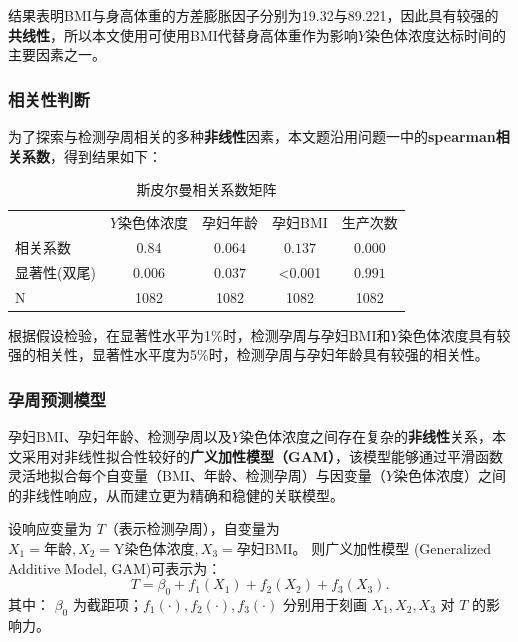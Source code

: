 \documentclass[12pt]{ctexart}
\begin{document}
	结果表明BMI与身高体重的方差膨胀因子分别为19.32与89.221，因此具有较强的\textbf{共线性}，所以本文使用可使用BMI代替身高体重作为影响$Y$染色体浓度达标时间的主要因素之一。
	
	\subsubsection{相关性判断}
	
	为了探索与检测孕周相关的多种\textbf{非线性}因素，本文题沿用问题一中的\textbf{spearman相关系数}，得到结果如下：
	\begin{table}[H]
		\centering
		\caption{斯皮尔曼相关系数矩阵}
		\begin{threeparttable}
			\setlength{\tabcolsep}{5pt} %
			\begin{tabular}{lcccc} 
				\toprule
				& $Y$染色体浓度 & 孕妇年龄  & 孕妇BMI  & 生产次数 \\
				\cmidrule(lr){2-5}
				相关系数
				& 0.84 & $0.064$ & $0.137$ &  $0.000$  \\
				显著性(双尾)
				& 0.006 & $0.037$ & <0.001 & $0.991$   \\
				N
				& 1082 & 1082 & 1082 & 1082  \\
				\bottomrule
			\end{tabular}
		\end{threeparttable}
	\end{table}

	根据假设检验，在显著性水平为1\%时，检测孕周与孕妇BMI和$Y$染色体浓度具有较强的相关性，显著性水平度为5\%时，检测孕周与孕妇年龄具有较强的相关性。
	
	\subsubsection{孕周预测模型}
	孕妇BMI、孕妇年龄、检测孕周以及$Y$染色体浓度之间存在复杂的\textbf{非线性}关系，本文采用对非线性拟合性较好的\textbf{广义加性模型（GAM）}，该模型能够通过平滑函数灵活地拟合每个自变量（BMI、年龄、检测孕周）与因变量（$Y$染色体浓度）之间的非线性响应，从而建立更为精确和稳健的关联模型。
	
	设响应变量为 $T$（表示检测孕周），自变量为
	$X_1 = \text{年龄},
	X_2 = \text{Y染色体浓度}, 
	X_3 = \text{孕妇BMI}$。
	则广义加性模型 (Generalized Additive Model, GAM)可表示为：
	\begin{equation}
		T
		= \beta_0 + f_1(X_1) + f_2(X_2) + f_3(X_3).
	\end{equation}
	其中：
	$\beta_0$ 为截距项；$f_1(\cdot), f_2(\cdot), f_3(\cdot)$ 分别用于刻画 $X_1, X_2, X_3$ 对 $T$ 的影响力。
	
\end{document}
